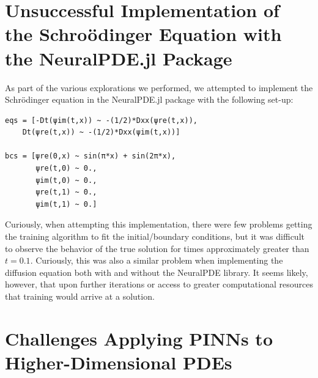 \documentclass[11pt]{article}
\newcommand{\1}{\mathbf 1}
\begin{document}







	\section{Unsuccessful Implementation of the Schro\"odinger Equation with the NeuralPDE.jl Package}

As part of the various explorations we performed, we attempted to implement the Schr\"odinger equation in the NeuralPDE.jl package with the following set-up:
\begin{singlespace}
\begin{verbatim}
eqs = [-Dt(ψim(t,x)) ~ -(1/2)*Dxx(ψre(t,x)),
	Dt(ψre(t,x)) ~ -(1/2)*Dxx(ψim(t,x))]

bcs = [ψre(0,x) ~ sin(π*x) + sin(2π*x),
       ψre(t,0) ~ 0.,
       ψim(t,0) ~ 0.,
       ψre(t,1) ~ 0.,
       ψim(t,1) ~ 0.]
\end{verbatim}
\end{singlespace}
Curiously, when attempting this implementation, there were few problems getting the training algorithm to fit the initial/boundary conditions, but it was difficult to observe the behavior of the true solution for times approximately greater than $t = 0.1$.
Curiously, this was also a similar problem when implementing the diffusion equation both with and without the NeuralPDE library.
It seems likely, however, that upon further iterations or access to greater computational resources that training would arrive at a solution.

\section{Challenges Applying PINNs to Higher-Dimensional PDEs}
\end{document}
